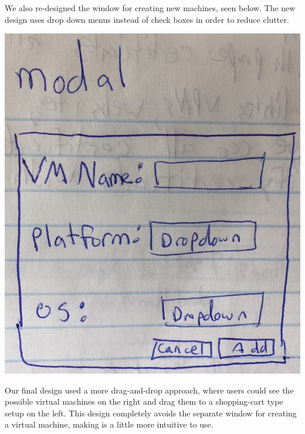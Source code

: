 \documentclass[openright]{report}
\begin{document}
\par We also re-designed the window for creating new machines, seen below. The new design uses drop down menus instead of check boxes in order to reduce clutter.

\begin{center}
    \includegraphics[scale=0.22]{images/modalDesign.JPG}
    \label{newModal}
\end{center}

\par Our final design used a more drag-and-drop approach, where users could see the possible virtual machines on the right and drag them to a shopping-cart type setup on the left. This design completely avoids the separate window for creating a virtual machine, making is a little more intuitive to use.
\end{document}

